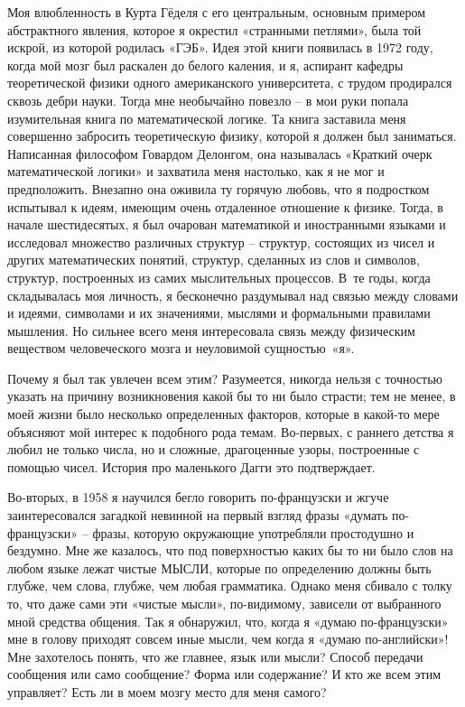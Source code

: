\documentclass[../main.tex]{subfiles}
\begin{document}
Моя влюбленность в Курта Гёделя с его центральным, основным примером абстрактного явления, которое я окрестил «странными петлями», была той искрой, из которой родилась «ГЭБ». Идея этой книги появилась в 1972 году, когда мой мозг был раскален до белого каления, и я, аспирант кафедры теоретической физики одного американского университета, с трудом продирался сквозь дебри науки. Тогда мне необычайно повезло \--- в мои руки попала изумительная книга по математической логике. Та книга заставила меня совершенно забросить теоретическую физику, которой я должен был заниматься. Написанная философом Говардом Делонгом, она называлась «Краткий очерк математической логики» и захватила меня настолько, как я не мог и предположить. Внезапно она оживила ту горячую любовь, что я подростком испытывал к идеям, имеющим очень отдаленное отношение к физике. Тогда, в начале шестидесятых, я был очарован математикой и иностранными языками и исследовал множество различных структур \--- структур, состоящих из чисел и других математических понятий, структур, сделанных из слов и символов, структур, построенных из самих мыслительных процессов. В~те годы, когда складывалась моя личность, я бесконечно раздумывал над связью между словами и идеями, символами и их значениями, мыслями и формальными правилами мышления. Но сильнее всего меня интересовала связь между физическим веществом человеческого мозга и неуловимой сущностью~«я».

Почему я был так увлечен всем этим? Разумеется, никогда нельзя с точностью указать на причину возникновения какой бы то ни было страсти; тем не менее, в моей жизни было несколько определенных факторов, которые в какой-то мере объясняют мой интерес к подобного рода темам. Во-первых, с раннего детства я любил не только числа, но и сложные, драгоценные узоры, построенные с помощью чисел. История про маленького Дагги это подтверждает.

Во-вторых, в 1958 я научился бегло говорить по-французски и жгуче заинтересовался загадкой невинной на первый взгляд фразы «думать по-французски» \--- фразы, которую окружающие употребляли простодушно и бездумно. Мне же казалось, что под поверхностью каких бы то ни было слов на любом языке лежат чистые МЫСЛИ, которые по определению должны быть глубже, чем слова, глубже, чем любая грамматика. Однако меня сбивало с толку то, что даже сами эти «чистые мысли», по-видимому, зависели от выбранного мной средства общения. Так я обнаружил, что, когда я «думаю по-французски» мне в голову приходят совсем иные мысли, чем когда я «думаю по-английски»! Мне захотелось понять, что же главнее, язык или мысли? Способ передачи сообщения или само сообщение? Форма или содержание? И кто же всем этим управляет? Есть ли в моем мозгу место для меня самого?
\end{document}
